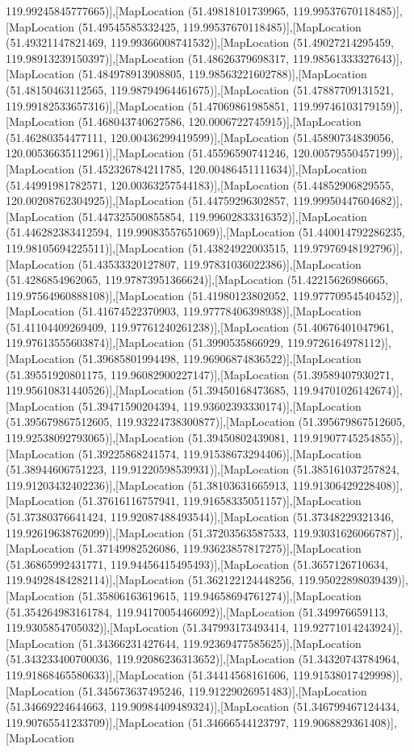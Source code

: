 119.99245845777665)],[MapLocation (51.49818101739965, 119.99537670118485)],[MapLocation (51.49545585332425, 119.99537670118485)],[MapLocation (51.49321147821469, 119.99366008741532)],[MapLocation (51.49027214295459, 119.98913239150397)],[MapLocation (51.48626379698317, 119.98561333327643)],[MapLocation (51.484978913908805, 119.98563221602788)],[MapLocation (51.48150463112565, 119.98794964461675)],[MapLocation (51.47887709131521, 119.99182533657316)],[MapLocation (51.47069861985851, 119.99746103179159)],[MapLocation (51.468043740627586, 120.0006722745915)],[MapLocation (51.46280354477111, 120.00436299419599)],[MapLocation (51.45890734839056, 120.00536635112961)],[MapLocation (51.45596590741246, 120.00579550457199)],[MapLocation (51.452326784211785, 120.00486451111634)],[MapLocation (51.44991981782571, 120.00363257544183)],[MapLocation (51.44852906829555, 120.00208762304925)],[MapLocation (51.44759296302857, 119.99950447604682)],[MapLocation (51.447325500855854, 119.99602833316352)],[MapLocation (51.446282383412594, 119.99083557651069)],[MapLocation (51.440014792286235, 119.98105694225511)],[MapLocation (51.43824922003515, 119.97976948192796)],[MapLocation (51.43533320127807, 119.97831036022386)],[MapLocation (51.4286854962065, 119.97873951366624)],[MapLocation (51.42215626986665, 119.97564960888108)],[MapLocation (51.41980123802052, 119.97770954540452)],[MapLocation (51.41674522370903, 119.97778406398938)],[MapLocation (51.41104409269409, 119.97761240261238)],[MapLocation (51.40676401047961, 119.97613555603874)],[MapLocation (51.3990535866929, 119.9726164978112)],[MapLocation (51.39685801994498, 119.96906874836522)],[MapLocation (51.39551920801175, 119.96082900227147)],[MapLocation (51.39589407930271, 119.95610831440526)],[MapLocation (51.39450168473685, 119.94701026142674)],[MapLocation (51.39471590204394, 119.93602393330174)],[MapLocation (51.395679867512605, 119.93224738300877)],[MapLocation (51.395679867512605, 119.92538092793065)],[MapLocation (51.39450802439081, 119.91907745254855)],[MapLocation (51.39225868241574, 119.91538673294406)],[MapLocation (51.38944606751223, 119.91220598539931)],[MapLocation (51.385161037257824, 119.91203432402236)],[MapLocation (51.38103631665913, 119.91306429228408)],[MapLocation (51.37616116757941, 119.91658335051157)],[MapLocation (51.37380376641424, 119.92087488493544)],[MapLocation (51.37348229321346, 119.92619638762099)],[MapLocation (51.37203563587533, 119.93031626066787)],[MapLocation (51.37149982526086, 119.93623857817275)],[MapLocation (51.36865992431771, 119.94456415495493)],[MapLocation (51.3657126710634, 119.94928484282114)],[MapLocation (51.362122124448256, 119.95022898039439)],[MapLocation (51.35806163619615, 119.94658694761274)],[MapLocation (51.354264983161784, 119.94170054466092)],[MapLocation (51.349976659113, 119.9305854705032)],[MapLocation (51.347993173493414, 119.92771014243924)],[MapLocation (51.34366231427644, 119.92369477585625)],[MapLocation (51.343233400700036, 119.92086236313652)],[MapLocation (51.34320743784964, 119.91868465580633)],[MapLocation (51.34414568161606, 119.91538017429998)],[MapLocation (51.345673637495246, 119.91229026951483)],[MapLocation (51.34669224644663, 119.90984409489324)],[MapLocation (51.346799467124434, 119.90765541233709)],[MapLocation (51.34666544123797, 119.9068829361408)],[MapLocation 